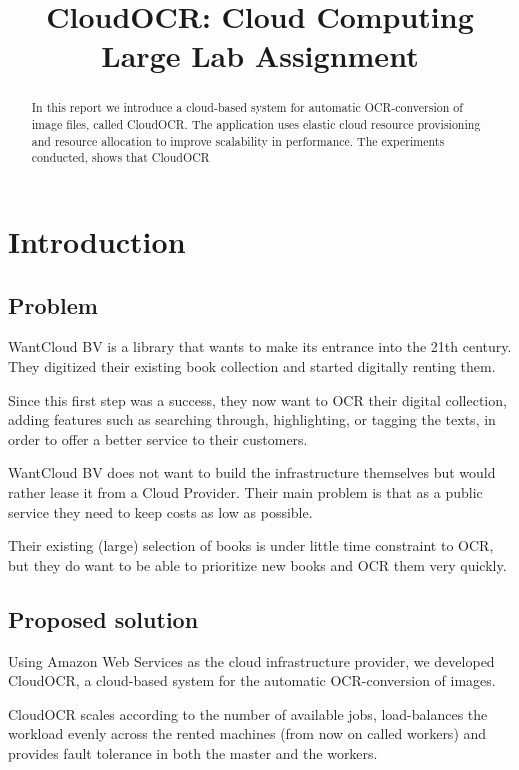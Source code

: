 \documentclass[a4paper]{IEEEtran}
\title{CloudOCR: Cloud Computing Large Lab Assignment}
\author{
	\IEEEauthorblockN{Tiago Mota \\}
	\IEEEauthorblockA{Email: neozflux@gmail.com \\}
	\and
	\IEEEauthorblockN{Eddy Bertoluzzo \\}
	\IEEEauthorblockA{Email: eddy.bertoluzzo@gmail.com \\}
	\and
	\IEEEauthorblockN{David Hoepelman\\}
	\IEEEauthorblockA{Email: dhoepelman@gmail.com\\}
	\and
	\IEEEauthorblockN{Course instructor: Alexandru Iosup\\}
	\IEEEauthorblockA{Email: A.Iosup@tudelft.nl \\}
}
\begin{document}
\maketitle

\begin{abstract}
In this report we introduce a cloud-based system for automatic OCR-conversion of image files, called CloudOCR. The application uses elastic cloud resource provisioning and resource allocation to improve scalability in performance. The experiments conducted, shows that CloudOCR
\end{abstract}

\section{Introduction}


\subsection*{Problem}

WantCloud BV is a library that wants to make its entrance into the 21th century. They digitized their existing book collection and started digitally renting them.

Since this first step was a success, they now want to OCR their digital collection, adding features such as searching through, highlighting, or tagging the texts, in order to offer a better service to their customers.

WantCloud BV does not want to build the infrastructure themselves but would rather lease it from a Cloud Provider. Their main problem is that as a public service they need to keep costs as low as possible.

Their existing (large) selection of books is under little time constraint to OCR, but they do want to be able to prioritize new books and OCR them very quickly.

\subsection*{Proposed solution}
Using Amazon Web Services as the cloud infrastructure provider, we developed CloudOCR, a cloud-based system for the automatic OCR-conversion of images.

CloudOCR scales according to the number of available jobs, load-balances the workload evenly across the rented machines (from now on called workers) and provides fault tolerance in both the master and the workers. 
\end{document}
